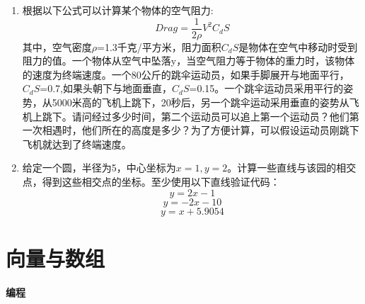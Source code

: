 \documentclass[UTF8]{ctexart}
\begin{document}
\begin{enumerate}
	\item  根据以下公式可以计算某个物体的空气阻力:\\$$Drag = \frac{1}{2\rho}V^{2}C_{d}S$$
	其中，空气密度$\rho$=1.3千克/平方米，阻力面积$C_{d}S$是物体在空气中移动时受到阻力的值。一个物体从空气中坠落y，当空气阻力等于物体的重力时，该物体的速度为终端速度。一个80公斤的跳伞运动员，如果手脚展开与地面平行，$C_{d}S$=0.7,如果头朝下与地面垂直，$C_{d}S$=0.15。一个跳伞运动员采用平行的姿势，从5000米高的飞机上跳下，20秒后，另一个跳伞运动采用垂直的姿势从飞机上跳下。请问经过多少时间，第二个运动员可以追上第一个运动员？他们第一次相遇时，他们所在的高度是多少？为了方便计算，可以假设运动员刚跳下飞机就达到了终端速度。
	\item 给定一个圆，半径为5，中心坐标为$x=1,y=2$。计算一些直线与该园的相交点，得到这些相交点的坐标。至少使用以下直线验证代码：$$y = 2x-1$$ $$y = -2x -10$$ $$ y = x +5.9054$$
\end{enumerate}
\section{向量与数组}
\textbf{编程}
\end{document}
